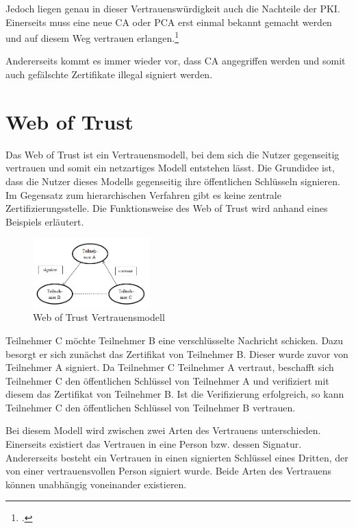 \documentclass  [paper=a4,
				fontsize=12pt,
				listof=totoc,
				bibliography=totoc
				]{scrreprt}
\begin{document}
			Jedoch liegen genau in dieser Vertrauenswürdigkeit auch die Nachteile der \ac{PKI}. Einerseits muss eine neue \ac{CA} oder \ac{PCA} erst einmal bekannt gemacht werden und auf diesem Weg vertrauen erlangen.\footcite[Vgl.][S. 24]{Schwenk}
			
			Andererseits kommt es immer wieder vor, dass \ac{CA} angegriffen werden und somit auch gefälschte Zertifikate illegal signiert werden.
				
		\section{Web of Trust}
			Das Web of Trust ist ein Vertrauensmodell, bei dem sich die Nutzer gegenseitig vertrauen und somit ein netzartiges Modell entstehen lässt. Die Grundidee ist, dass die Nutzer dieses Modells gegenseitig ihre öffentlichen Schlüsseln signieren. Im Gegensatz zum hierarchischen Verfahren gibt es keine zentrale Zertifizierungsstelle.
			Die Funktionsweise des Web of Trust wird anhand eines Beispiels erläutert.
			\begin{figure}
			\centering
				\includegraphics[width=0.4\textwidth]{images/WOT.png}
			\caption[Web of Trust Vertrauensmodell]{Web of Trust Vertrauensmodell\footnotemark}
			\end{figure}
			Teilnehmer C möchte Teilnehmer B eine verschlüsselte Nachricht schicken. Dazu besorgt er sich zunächst das Zertifikat von Teilnehmer B. Dieser wurde zuvor von Teilnehmer A signiert. Da Teilnehmer C Teilnehmer A vertraut, beschafft sich Teilnehmer C den öffentlichen Schlüssel von Teilnehmer A und verifiziert mit diesem das Zertifikat von Teilnehmer B. Ist die Verifizierung erfolgreich, so kann Teilnehmer C den öffentlichen Schlüssel von Teilnehmer B vertrauen.
			
			Bei diesem Modell wird zwischen zwei Arten des Vertrauens unterschieden. Einerseits existiert das Vertrauen in eine Person bzw. dessen Signatur. Andererseits besteht ein Vertrauen in einen signierten Schlüssel eines Dritten, der von einer vertrauensvollen Person signiert wurde. Beide Arten des Vertrauens können unabhängig voneinander existieren.
\end{document}
